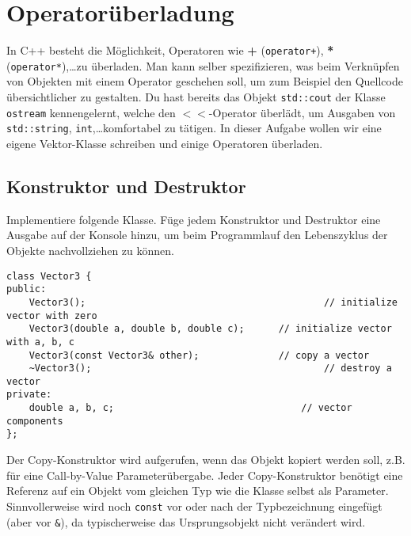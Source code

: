 


\newpage
\section{Operatorüberladung}
In C++ besteht die Möglichkeit, Operatoren wie \textbf{+} (\texttt{operator+}), \textbf{*} (\texttt{operator*}),\dots zu überladen.
Man kann selber spezifizieren, was beim Verknüpfen von Objekten mit einem Operator geschehen soll, um zum Beispiel den Quellcode übersichtlicher zu gestalten.
Du hast bereits das Objekt \texttt{std::cout} der Klasse \texttt{ostream} kennengelernt, welche den $<<$-Operator überlädt, um Ausgaben von \texttt{std::string}, \texttt{int},\dots komfortabel zu tätigen.
In dieser Aufgabe wollen wir eine eigene Vektor-Klasse schreiben und einige Operatoren überladen.


\subsection{Konstruktor und Destruktor}
Implementiere folgende Klasse.
Füge jedem Konstruktor und Destruktor eine Ausgabe auf der Konsole hinzu, um beim Programmlauf den Lebenszyklus der Objekte nachvollziehen zu können.
\begin{lstlisting}
class Vector3 {
public:
	Vector3();											// initialize vector with zero
	Vector3(double a, double b, double c);		// initialize vector with a, b, c
	Vector3(const Vector3& other);				// copy a vector
	~Vector3();											// destroy a vector
private:
	double a, b, c;									// vector components
};
\end{lstlisting}

Der Copy-Konstruktor wird aufgerufen, wenn das Objekt kopiert werden soll, z.B. für eine Call-by-Value Parameterübergabe.
Jeder Copy-Konstruktor benötigt eine Referenz auf ein Objekt vom gleichen Typ wie die Klasse selbst als Parameter. 
Sinnvollerweise wird noch \texttt{const} vor oder nach der Typbezeichnung eingefügt (aber vor \texttt{\&}), da typischerweise das Ursprungsobjekt nicht verändert wird.

